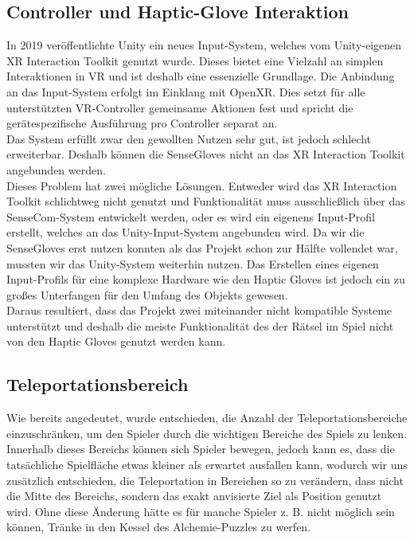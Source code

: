 \subsection{Controller und Haptic-Glove Interaktion}
In 2019 veröffentlichte Unity ein neues Input-System, welches vom Unity-eigenen XR Interaction Toolkit genutzt wurde. Dieses bietet eine Vielzahl an simplen Interaktionen in VR und ist deshalb eine essenzielle Grundlage. Die Anbindung an das Input-System erfolgt im Einklang mit OpenXR. Dies setzt für alle unterstützten VR-Controller gemeinsame Aktionen fest und spricht die gerätespezifische Ausführung pro Controller separat an.\\

\noindent Das System erfüllt zwar den gewollten Nutzen sehr gut, ist jedoch schlecht erweiterbar. Deshalb können die SenseGloves nicht an das XR Interaction Toolkit angebunden werden. \\

\noindent Dieses Problem hat zwei mögliche Lösungen. Entweder wird das XR Interaction Toolkit schlichtweg nicht genutzt und Funktionalität muss ausschließlich über das SenseCom-System entwickelt werden, oder es wird ein eigenens Input-Profil erstellt, welches an das Unity-Input-System angebunden wird. Da wir die SenseGloves erst nutzen konnten als das Projekt schon zur Hälfte vollendet war, mussten wir das Unity-System weiterhin nutzen. Das Erstellen eines eigenen Input-Profils für eine komplexe Hardware wie den Haptic Gloves ist jedoch ein zu großes Unterfangen für den Umfang des Objekts gewesen.\\

\noindent Daraus resultiert, dass das Projekt zwei miteinander nicht kompatible Systeme unterstützt und deshalb die meiste Funktionalität des der Rätsel im Spiel nicht von den Haptic Gloves genutzt werden kann.

\subsection{Teleportationsbereich}
Wie bereits angedeutet, wurde entschieden, die Anzahl der Teleportationsbereiche einzu\-schränken, um den Spieler durch die wichtigen Bereiche des Spiels zu lenken. Innerhalb dieses Bereichs können sich Spieler bewegen, jedoch kann es, dass die tatsächliche Spielfläche etwas kleiner als erwartet ausfallen kann, wodurch wir uns zusätzlich entschieden, die Teleportation in Bereichen so zu verändern, dass nicht die Mitte des Bereichs, sondern das exakt anvisierte Ziel als Position genutzt wird. Ohne diese Änderung hätte es für manche Spieler z. B. nicht möglich sein können, Tränke in den Kessel des Alchemie-Puzzles zu werfen.
